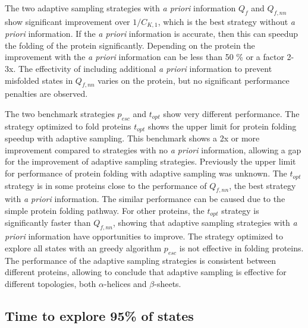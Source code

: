 The two adaptive sampling strategies with \emph{a priori} information $Q_{f}$ and $Q_{f,nn}$ show significant improvement over $1/C_{K, 1}$, which is the best strategy without \emph{a priori} information. If the \emph{a priori} information is accurate, then this can speedup the folding of the protein significantly. Depending on the protein the improvement with the \emph{a priori} information can be less than 50
\% or a factor 2-3x. The effectivity of including additional \emph{a priori} information to prevent misfolded states in $Q_{f,nn}$ varies on the protein, but no significant performance penalties are observed.

The two benchmark strategies $p_{esc}$ and $t_{opt}$ show very different performance. The strategy optimized to fold proteins $t_{opt}$ shows the upper limit for protein folding speedup with adaptive sampling. This benchmark shows a 2x or more improvement compared to strategies with no \emph{a priori} information, allowing a gap for the improvement of adaptive sampling strategies. Previously the upper limit for performance of protein folding with adaptive sampling was unknown. The $t_{opt}$ strategy is in some proteins close to the performance of $Q_{f,nn}$, the best strategy with \emph{a priori} information. The similar performance can be caused due to the simple protein folding pathway. For other proteins, the $t_{opt}$ strategy is significantly faster than $Q_{f,nn}$, showing that adaptive sampling strategies with \emph{a priori} information have opportunities to improve. The strategy optimized to explore all states with an greedy algorithm $p_{esc}$ is not effective in folding proteins. The performance of the adaptive sampling strategies is consistent between different proteins, allowing to conclude that adaptive sampling is effective for different topologies, both $\alpha$-helices and $\beta$-sheets.

\subsection{\label{sec:time-explore}Time to explore 95\% of states}

